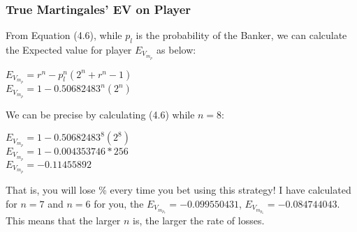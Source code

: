\documentclass{article}
\begin{document}
\subsubsection{True Martingales' EV on Player}
From Equation (4.6), while $p_l$ is the probability of the Banker, we can calculate the Expected value for player $E_{V_{m_p}}$ as below: \\

\begin{center}
$E_{V_{m_p}}=r^n-p_l^n(2^n+r^n-1)$\\
$E_{V_{m_p}}=1-0.50682483^n(2^n)$\\
\end{center}
\begin{center}
\end{center}
We can be precise by calculating (4.6) while $n=8$:\par
\begin{center}
$E_{V_{m_p}}=1-0.50682483^8(2^8)$\\
$E_{V_{m_p}}=1-0.004353746*256$\\
$E_{V_{m_p}}=-0.11455892$\\
\end{center}

That is, you will lose \% every time you bet using this strategy! I have calculated for $n=7$ and $n=6$ for you, the $E_{V_{m_{p_7}}}=-0.099550431$, $E_{V_{m_{p_6}}}=-0.084744043$.  This means that the larger $n$ is, the larger the rate of losses.  
\end{document}

